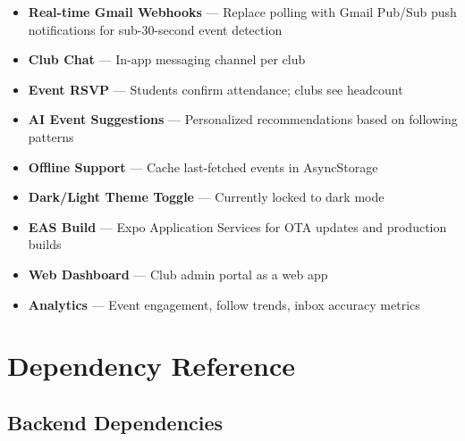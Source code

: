 \documentclass[12pt,a4paper]{report}
\begin{document}
\begin{itemize}[leftmargin=*]
  \item \textbf{Real-time Gmail Webhooks} — Replace polling with Gmail Pub/Sub push notifications for sub-30-second event detection
  \item \textbf{Club Chat} — In-app messaging channel per club
  \item \textbf{Event RSVP} — Students confirm attendance; clubs see headcount
  \item \textbf{AI Event Suggestions} — Personalized recommendations based on following patterns
  \item \textbf{Offline Support} — Cache last-fetched events in AsyncStorage
  \item \textbf{Dark/Light Theme Toggle} — Currently locked to dark mode
  \item \textbf{EAS Build} — Expo Application Services for OTA updates and production builds
  \item \textbf{Web Dashboard} — Club admin portal as a web app
  \item \textbf{Analytics} — Event engagement, follow trends, inbox accuracy metrics
\end{itemize}

\chapter{Dependency Reference}

\section{Backend Dependencies}
\end{document}
